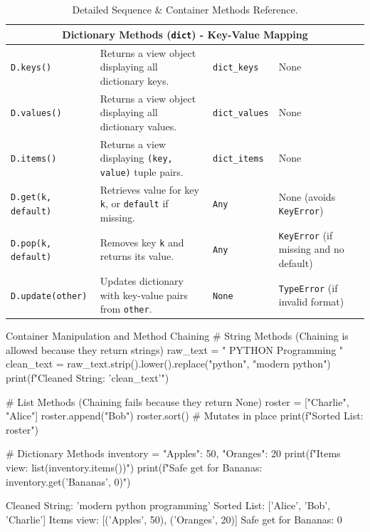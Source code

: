 \begin{table}[htbp]
\begin{tabularx}{\linewidth}{l>{\raggedright\arraybackslash}Xl>{\raggedright\arraybackslash}X}
\midrule
\multicolumn{4}{c}{\cellcolor{pybg}\textbf{Dictionary Methods (\texttt{dict}) - Key-Value Mapping}} \\
\midrule
\texttt{D.keys()} & Returns a view object displaying all dictionary keys. & \texttt{dict\_keys} & None \\
\texttt{D.values()} & Returns a view object displaying all dictionary values. & \texttt{dict\_values} & None \\
\texttt{D.items()} & Returns a view displaying \texttt{(key, value)} tuple pairs. & \texttt{dict\_items} & None \\
\texttt{D.get(k, default)} & Retrieves value for key \texttt{k}, or \texttt{default} if missing. & \texttt{Any} & None (avoids \texttt{KeyError}) \\
\texttt{D.pop(k, default)} & Removes key \texttt{k} and returns its value. & \texttt{Any} & \texttt{KeyError} (if missing and no default) \\
\texttt{D.update(other)} & Updates dictionary with key-value pairs from \texttt{other}. & \texttt{None} & \texttt{TypeError} (if invalid format) \\
\bottomrule
\end{tabularx}
\caption{Detailed Sequence \& Container Methods Reference.}
\label{tab:master-container-methods}
\end{table}

\begin{pythoncode}[]{Container Manipulation and Method Chaining}
# String Methods (Chaining is allowed because they return strings)
raw_text = "  PYTHON Programming  "
clean_text = raw_text.strip().lower().replace("python", "modern python")
print(f"Cleaned String: '{clean_text}'")

# List Methods (Chaining fails because they return None)
roster = ["Charlie", "Alice"]
roster.append("Bob")
roster.sort() # Mutates in place
print(f"Sorted List: {roster}")

# Dictionary Methods
inventory = {"Apples": 50, "Oranges": 20}
print(f"Items view: {list(inventory.items())}")
print(f"Safe get for Bananas: {inventory.get('Bananas', 0)}")
\end{pythoncode}
\begin{outputbox}
Cleaned String: 'modern python programming'
Sorted List: ['Alice', 'Bob', 'Charlie']
Items view: [('Apples', 50), ('Oranges', 20)]
Safe get for Bananas: 0
\end{outputbox}

